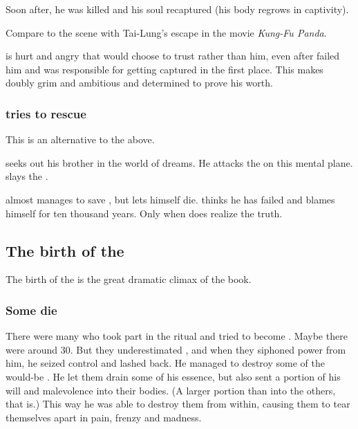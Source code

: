 Soon after, he was killed and his soul recaptured (his body regrows in captivity). 

Compare to the scene with Tai-Lung's escape in the movie \emph{Kung-Fu Panda}. 

\Secherdamon{} is hurt and angry that \Nexagglachel{} would choose to trust \Ishnaruchaefir{} rather than him, even after \Ishnaruchaefir{} failed him and was responsible for getting \Nexagglachel{} captured in the first place. 
This makes \Secherdamon{} doubly grim and ambitious and determined to prove his worth. 





\subsubsection{\Ishnaruchaefir tries to rescue \Nexagglachel}
This is an alternative to the above.

\Ishnaruchaefir seeks out his brother in the world of dreams.
He attacks the \resphain on this mental plane. 
\Ishnaruchaefir slays the \resphan \Nathrach.

\Ishnaruchaefir almost manages to save \Nexagglachel, but \Nexagglachel lets himself die.
\Ishnaruchaefir thinks he has failed and blames himself for ten thousand years.
Only when  does \Nexagglachel realize the truth. 









\subsection{The birth of the \Satharioth}
The birth of the \satharioth is the great dramatic climax of the book.





\subsubsection{Some \satharioth{} die}
There were many who took part in the ritual and tried to become \satharioth. 
Maybe there were around 30. 
But they underestimated \Nexagglachel, and when they siphoned power from him, he seized control and lashed back.
He managed to destroy some of the would-be \satharioth.
He let them drain some of his essence, but also sent a portion of his will and malevolence into their bodies.
(A larger portion than into the others, that is.)
This way he was able to destroy them from within, causing them to tear themselves apart in pain, frenzy and madness.

